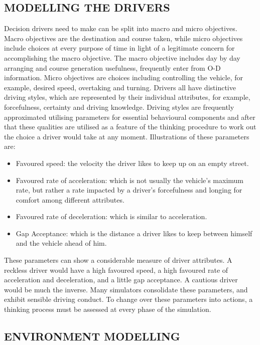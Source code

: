 \documentclass[11pt,a4paper]{article}
\begin{document}
\subsection{MODELLING THE DRIVERS}

Decision drivers need to make can be split into macro and micro objectives. Macro objectives are the destination and course taken, while micro objectives include choices at every purpose of time in light of a legitimate concern for accomplishing the macro objective. The macro objective includes day by day arranging and course generation usefulness, frequently enter from O-D information. Micro objectives are choices including controlling the vehicle, for example, desired speed, overtaking and turning. Drivers all have distinctive driving styles, which are represented by their individual attributes, for example, forcefulness, certainty and driving knowledge. Driving styles are frequently approximated utilising parameters for essential behavioural components and after that these qualities are utilised as a feature of the thinking procedure to work out the choice a driver would take at any moment. Illustrations of these parameters are: 
\begin{itemize}
\item Favoured speed: the velocity the driver likes to keep up on an empty street. 
\item Favoured rate of acceleration: which is not usually the vehicle's maximum rate, but rather a rate impacted by a driver's forcefulness and longing for comfort among different attributes. 
\item Favoured rate of deceleration: which is similar to acceleration. 
\item Gap Acceptance: which is the distance a driver likes to keep between himself and the vehicle ahead of him.
\end{itemize}
These parameters can show a considerable measure of driver attributes. A reckless driver would have a high favoured speed, a high favoured rate of acceleration and deceleration, and a little gap acceptance. A cautious driver would be much the inverse. Many simulators consolidate these parameters, and exhibit sensible driving conduct. To change over these parameters into actions, a thinking process must be assessed at every phase of the simulation.



\subsection{ENVIRONMENT MODELLING}
\end{document}
